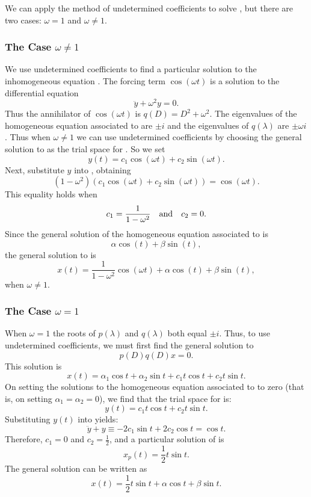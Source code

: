 We can apply the method of undetermined coefficients to solve , 
but there are two cases: $\omega=1$ and $\omega\neq 1$. 

\subsubsection*{The Case $\omega\not= 1$}  

We use undetermined coefficients to find a particular solution to the 
inhomogeneous equation .  The forcing term $\cos(\omega t)$ is 
a solution to the differential equation 
\begin{equation}  \label{E:omega}
\ddot{y} + \omega^2y = 0.
\end{equation}
Thus the annihilator 
of $\cos(\omega t)$ is $q(D)=D^2+\omega^2$.  The 
eigenvalues of the homogeneous equation associated to  are 
$\pm i$ and the eigenvalues of $q(\lambda)$ are $\pm\omega i$.  Thus when 
$\omega\neq 1$ we can use undetermined coefficients by choosing the general 
solution to  as the trial space 
for .  So we set
\[
y(t) = c_1\cos(\omega t) + c_2\sin(\omega t).
\]
Next, substitute $y$ into , obtaining
\[
(1-\omega ^2)(c_1\cos(\omega t) + c_2\sin(\omega t)) = \cos(\omega t).
\]
This equality holds when 
\[
c_1 = \frac{1}{1-\omega ^2} \quad\mbox{and}\quad c_2=0.
\]
Since the general solution of the 
homogeneous equation associated 
to  is
\[
\alpha \cos(t)+\beta\sin(t),
\]
the general solution to  is
\[
x(t) =\frac{1}{1-\omega ^2}\cos(\omega t) + \alpha\cos(t) + \beta\sin(t),
\]
when $\omega \neq 1$. 

\subsubsection*{The Case $\omega= 1$}

When $\omega= 1$ the roots of $p(\lambda)$ and $q(\lambda)$ both equal 
$\pm i$.  Thus, to use undetermined coefficients, we must first find the 
general solution to 
\[
p(D)q(D)x = 0.
\]
This solution is 
\[
x(t) = \alpha_1\cos t + \alpha_2\sin t + c_1t\cos t + c_2t\sin t.
\]
On setting the solutions to the homogeneous equation associated to 
 to zero (that is, on setting $\alpha_1=\alpha_2=0$), we 
find that the trial space for  is:
\[
y(t) = c_1t\cos t + c_2t\sin t.
\]
Substituting $y(t)$ into  yields:
\[
\ddot{y} + y \equiv -2c_1\sin t + 2c_2\cos t = \cos t.
\]
Therefore, $c_1=0$ and $c_2=\frac{1}{2}$, and a particular solution of 
 is 
\[
x_p(t) = \frac{1}{2}t\sin t.
\]
The general solution can be written as
\[
x(t) = \frac{1}{2}t\sin t+\alpha\cos t+\beta\sin t.
\]

